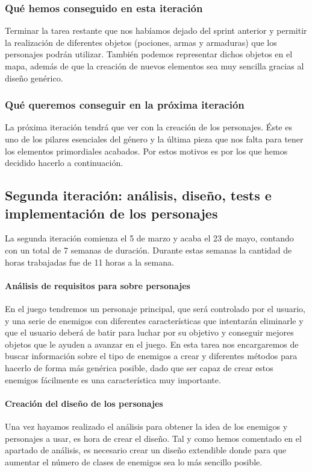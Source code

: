\subsubsection{Qué hemos conseguido en esta iteración}

Terminar la tarea restante que nos habíamos dejado del sprint anterior y permitir la realización de diferentes objetos (pociones, armas y armaduras) que los personajes podrán utilizar. También podemos representar dichos objetos en el mapa, además de que la creación de nuevos elementos sea muy sencilla gracias al diseño genérico.

\subsubsection{Qué queremos conseguir en la próxima iteración}

La próxima iteración tendrá que ver con la creación de los personajes. Éste es uno de los pilares esenciales del género y la última pieza que nos falta para tener los elementos primordiales acabados. Por estos motivos es por los que hemos decidido hacerlo a continuación.

\subsection{Segunda iteración: análisis, diseño, tests e implementación de los personajes}

La segunda iteración comienza el 5 de marzo y acaba el 23 de mayo, contando con un total de 7 semanas de duración. Durante estas semanas la cantidad de horas trabajadas fue de 11 horas a la semana.

\paragraph{Análisis de requisitos para sobre personajes} En el juego tendremos un personaje principal, que será controlado por el usuario, y una serie de enemigos con diferentes características que intentarán eliminarle y que el usuario deberá de batir para luchar por su objetivo y conseguir mejores objetos que le ayuden a avanzar en el juego. En esta tarea nos encargaremos de buscar información sobre el tipo de enemigos a crear y diferentes métodos para hacerlo de forma más genérica posible, dado que ser capaz de crear estos enemigos fácilmente es una característica muy importante.

\paragraph{Creación del diseño de los personajes} Una vez hayamos realizado el análisis para obtener la idea de los enemigos y personajes a usar, es hora de crear el diseño. Tal y como hemos comentado en el apartado de análisis, es necesario crear un diseño extendible donde para que aumentar el número de clases de enemigos sea lo más sencillo posible.


